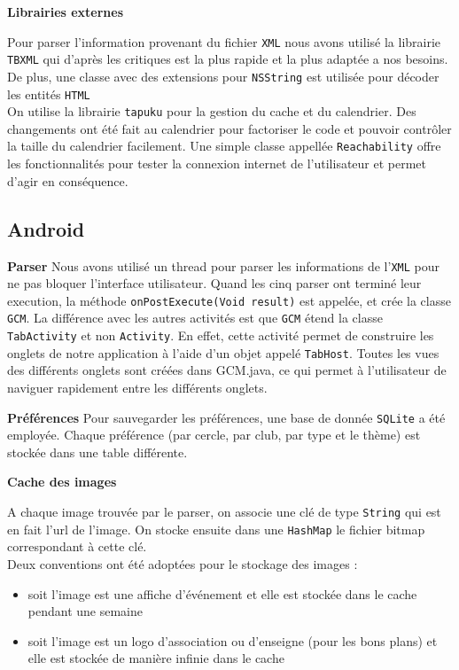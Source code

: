\documentclass[a4paper, 11px]{article}
\begin{document}
{\bf Librairies externes}

Pour parser l'information provenant du fichier \texttt{XML} nous avons utilisé la librairie \texttt{TBXML} qui d'après les critiques est la plus rapide et la plus adaptée a nos besoins. De plus, une classe avec des extensions pour \texttt{NSString} est utilisée pour décoder les entités \texttt{HTML}\\
\indent On utilise la librairie \texttt{tapuku} pour la gestion du cache et du calendrier. Des changements ont été fait au calendrier pour factoriser le code et pouvoir contrôler la taille du calendrier facilement.
Une simple classe appellée \texttt{Reachability} offre les fonctionnalités pour tester la connexion internet de l'utilisateur et permet d'agir en conséquence.


\subsection{Android}
{\bf Parser}
Nous avons utilisé un thread pour parser les informations de l'\texttt{XML} pour ne pas bloquer l'interface utilisateur. Quand les cinq parser ont terminé leur execution, la méthode \texttt{onPostExecute(Void result)} est appelée, et crée la classe \texttt{GCM}. La différence avec les autres activités est que \texttt{GCM} étend la classe \texttt{TabActivity} et non \texttt{Activity}. En effet, cette activité permet de construire les onglets de notre application à l'aide d'un objet appelé \texttt{TabHost}. Toutes les vues des différents onglets sont créées dans GCM.java, ce qui permet à l'utilisateur de naviguer rapidement entre les différents onglets.


{\bf Préférences}
Pour sauvegarder les préférences, une base de donnée \texttt{SQLite} a été employée. Chaque préférence (par cercle, par club, par type et le thème) est stockée dans une table différente.
 
{\bf Cache des images}

A chaque image trouvée par le parser, on associe une clé de type \texttt{String} qui est en fait l'url de l'image. On stocke ensuite dans une \texttt{HashMap} le fichier bitmap correspondant à cette clé.\\
Deux conventions ont été adoptées pour le stockage des images :
\begin{itemize}
\item soit l'image est une affiche d'événement et elle est stockée dans le cache pendant une semaine
\item soit l'image est un logo d'association ou d'enseigne (pour les bons plans) et elle est stockée de manière infinie dans le cache\\
\end{itemize}
\end{document}
